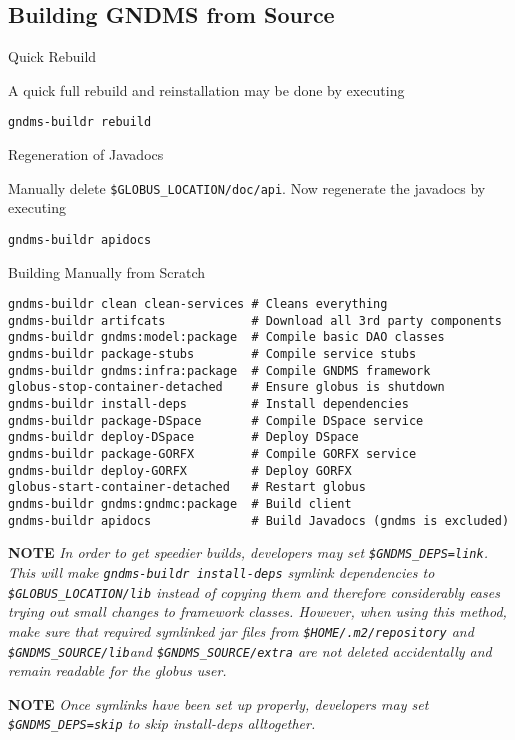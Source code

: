 \documentclass{article}
\begin{document}
\subsection{Building GNDMS from Source}

Quick Rebuild

A quick full rebuild and reinstallation may be done by executing

\begin{verbatim}
gndms-buildr rebuild
\end{verbatim}
Regeneration of Javadocs

Manually delete \verb!$GLOBUS_LOCATION/doc/api!. Now regenerate the
javadocs by executing

\begin{verbatim}
gndms-buildr apidocs
\end{verbatim}
Building Manually from Scratch

\begin{verbatim}
gndms-buildr clean clean-services # Cleans everything
gndms-buildr artifcats            # Download all 3rd party components
gndms-buildr gndms:model:package  # Compile basic DAO classes
gndms-buildr package-stubs        # Compile service stubs
gndms-buildr gndms:infra:package  # Compile GNDMS framework
globus-stop-container-detached    # Ensure globus is shutdown
gndms-buildr install-deps         # Install dependencies
gndms-buildr package-DSpace       # Compile DSpace service
gndms-buildr deploy-DSpace        # Deploy DSpace
gndms-buildr package-GORFX        # Compile GORFX service
gndms-buildr deploy-GORFX         # Deploy GORFX
globus-start-container-detached   # Restart globus
gndms-buildr gndms:gndmc:package  # Build client
gndms-buildr apidocs              # Build Javadocs (gndms is excluded)
\end{verbatim}

\textbf{NOTE}
\emph{In order to get speedier builds, developers may set \texttt{\$GNDMS\_DEPS=link}. This will make \texttt{gndms-buildr install-deps} symlink dependencies to \texttt{\$GLOBUS\_LOCATION/lib} instead of copying them and therefore considerably eases trying out small changes to framework classes. However, when using this method, make sure that required symlinked jar files from \texttt{\$HOME/.m2/repository} and \texttt{\$GNDMS\_SOURCE/lib}and \texttt{\$GNDMS\_SOURCE/extra} are not deleted accidentally and remain readable for the globus user.}

\textbf{NOTE}
\emph{Once symlinks have been set up properly, developers may set \texttt{\$GNDMS\_DEPS=skip} to skip install-deps alltogether.}
\end{document}
